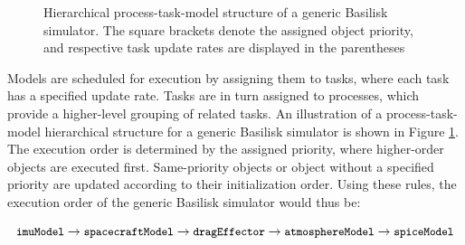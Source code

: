 \begin{figure}[htbp]
    \small
    \caption{Hierarchical process-task-model structure of a generic Basilisk simulator. The square brackets denote the assigned object priority, and respective task update rates are displayed in the parentheses}
    \label{fig:general_process_hierarchy}
\end{figure}


\clearpage
Models are scheduled for execution by assigning them to tasks, where each task has a specified update rate. Tasks are in turn assigned to processes, which provide a higher-level grouping of related tasks. An illustration of a process-task-model hierarchical structure for a generic Basilisk simulator is shown in Figure \ref{fig:general_process_hierarchy}. The execution order is determined by the assigned priority, where higher-order objects are executed first. Same-priority objects or object without a specified priority are updated according to their initialization order. Using these rules, the execution order of the generic Basilisk simulator would thus be:

\begin{equation*}
    \small
    \texttt{imuModel}
    \rightarrow
    \texttt{spacecraftModel}
    \rightarrow 
    \texttt{dragEffector} 
    \rightarrow 
    \texttt{atmosphereModel} 
    \rightarrow
    \texttt{spiceModel}
\end{equation*}




